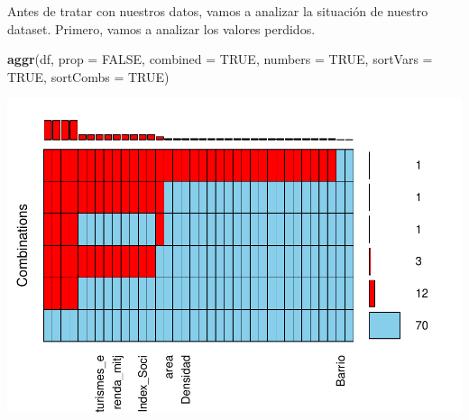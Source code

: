 \documentclass[notspecified,article,submit,moreauthors,pdftex]{Definitions/mdpi}
\newenvironment{Shaded}{\begin{snugshade}}{\end{snugshade}}
\newcommand{\AttributeTok}[1]{\textcolor[rgb]{0.13,0.29,0.53}{#1}}
\newcommand{\ConstantTok}[1]{\textcolor[rgb]{0.56,0.35,0.01}{#1}}
\newcommand{\FunctionTok}[1]{\textcolor[rgb]{0.13,0.29,0.53}{\textbf{#1}}}
\newcommand{\NormalTok}[1]{#1}
\begin{document}
Antes de tratar con nuestros datos, vamos a analizar la situación de
nuestro dataset. Primero, vamos a analizar los valores perdidos.

\begin{Shaded}
\begin{Highlighting}[]
\FunctionTok{aggr}\NormalTok{(df, }\AttributeTok{prop =} \ConstantTok{FALSE}\NormalTok{, }\AttributeTok{combined =} \ConstantTok{TRUE}\NormalTok{, }\AttributeTok{numbers =} \ConstantTok{TRUE}\NormalTok{, }\AttributeTok{sortVars =} \ConstantTok{TRUE}\NormalTok{, }\AttributeTok{sortCombs =} \ConstantTok{TRUE}\NormalTok{)}
\end{Highlighting}
\end{Shaded}

\begin{center}\includegraphics{./figure/unnamed-chunk-25-1} \end{center}
\end{document}
